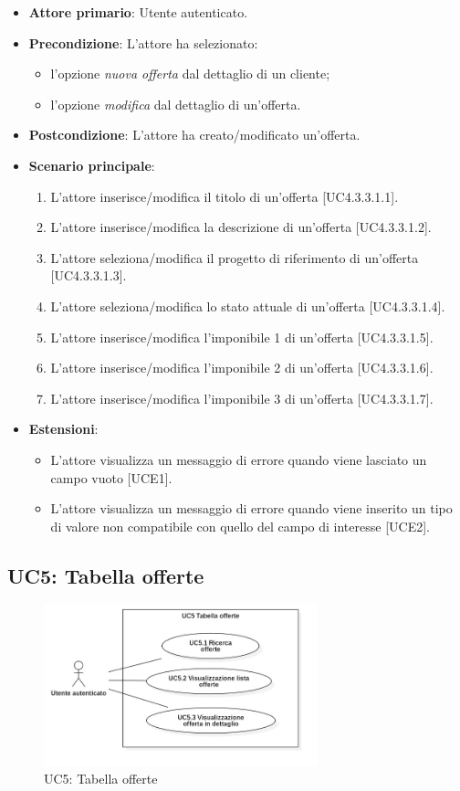 \begin{itemize}
\item \textbf{Attore primario}: Utente autenticato.
\item \textbf{Precondizione}: L'attore ha selezionato: 
\begin{itemize}
\item l'opzione \textit{nuova offerta} dal dettaglio di un cliente;
\item l'opzione \textit{modifica} dal dettaglio di un'offerta.
\end{itemize}
\item \textbf{Postcondizione}: L'attore ha creato/modificato un'offerta.
\item \textbf{Scenario principale}: 
\begin{enumerate}
\item L'attore inserisce/modifica il titolo di un'offerta [UC4.3.3.1.1].
\item L'attore inserisce/modifica la descrizione di un'offerta [UC4.3.3.1.2].
\item L'attore seleziona/modifica il progetto di riferimento di un'offerta [UC4.3.3.1.3].
\item L'attore seleziona/modifica lo stato attuale di un'offerta [UC4.3.3.1.4].
\item L'attore inserisce/modifica l'imponibile 1 di un'offerta [UC4.3.3.1.5].
\item L'attore inserisce/modifica l'imponibile 2 di un'offerta [UC4.3.3.1.6].
\item L'attore inserisce/modifica l'imponibile 3 di un'offerta [UC4.3.3.1.7].
\end{enumerate}
\item \textbf{Estensioni}: 
\begin{itemize}
\item L'attore visualizza un messaggio di errore quando viene lasciato un campo vuoto [UCE1].
\item L'attore visualizza un messaggio di errore quando viene inserito un tipo di valore non compatibile con quello del campo di interesse [UCE2].
\end{itemize} 
\end{itemize}

\pagebreak

\subsection{UC5: Tabella offerte}
\begin{figure}[!h]
\centering
\includegraphics[width=300px]{../images/UC/.jpeg/UC5.0-tabellaOfferte.jpg}
\caption{UC5: Tabella offerte}
\end{figure}

